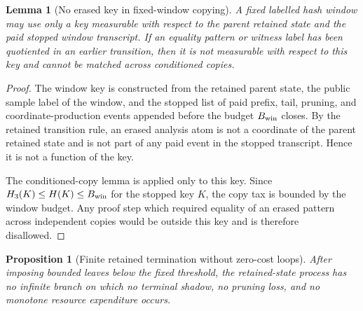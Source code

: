 \documentclass[11pt]{article}
\newtheorem{lemma}[theorem]{Lemma}
\newtheorem{proposition}[theorem]{Proposition}
\theoremstyle{remark}
\begin{document}
\begin{lemma}[No erased key in fixed-window copying]\label{lem:crit-no-erased-key}
A fixed labelled hash window may use only a key measurable with respect to the parent retained state and the paid stopped window transcript.  If an equality pattern or witness label has been quotiented in an earlier transition, then it is not measurable with respect to this key and cannot be matched across conditioned copies.
\end{lemma}

\begin{proof}
The window key is constructed from the retained parent state, the public sample label of the window, and the stopped list of paid prefix, tail, pruning, and coordinate-production events appended before the budget $B_{\rm win}$ closes.  By the retained transition rule, an erased analysis atom is not a coordinate of the parent retained state and is not part of any paid event in the stopped transcript.  Hence it is not a function of the key.

The conditioned-copy lemma is applied only to this key.  Since $H_3(K)\le H(K)\le B_{\rm win}$ for the stopped key $K$, the copy tax is bounded by the window budget.  Any proof step which required equality of an erased pattern across independent copies would be outside this key and is therefore disallowed.
\end{proof}

\begin{proposition}[Finite retained termination without zero-cost loops]\label{prop:crit-no-loop}
After imposing bounded leaves below the fixed threshold, the retained-state process has no infinite branch on which no terminal shadow, no pruning loss, and no monotone resource expenditure occurs.
\end{proposition}
\end{document}
